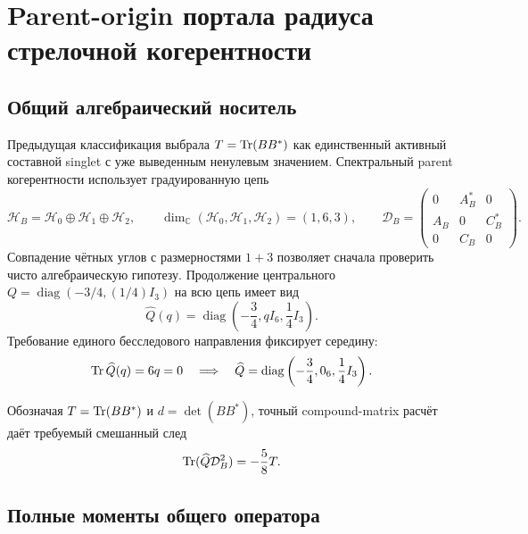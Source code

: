 \chapter{Parent-origin портала радиуса стрелочной когерентности}
\label{ch:v8-baryon-c0-edge-coherence-radius-portal-parent-origin}

\section{Общий алгебраический носитель}

Предыдущая классификация выбрала
$T=\operatorname{Tr}(BB^*)$ как единственный активный составной singlet с уже
выведенным ненулевым значением. Спектральный parent когерентности использует
градуированную цепь
\begin{equation}
 \mathcal H_B=\mathcal H_0\oplus\mathcal H_1\oplus\mathcal H_2,
 \qquad
 \dim_{\mathbb C}(\mathcal H_0,\mathcal H_1,\mathcal H_2)=(1,6,3),
 \qquad
 \mathcal D_B=
 \begin{pmatrix}0&A_B^*&0\\A_B&0&C_B^*\\0&C_B&0\end{pmatrix}.
 \label{eq:v8-coherence-portal-chain}
\end{equation}
Совпадение чётных углов с размерностями $1+3$ позволяет сначала проверить
чисто алгебраическую гипотезу. Продолжение центрального
$Q=\operatorname{diag}(-3/4,(1/4)I_3)$ на всю цепь имеет вид
\begin{equation}
 \widehat Q(q)=\operatorname{diag}
 \left(-\frac34,qI_6,\frac14I_3\right).
 \label{eq:v8-coherence-portal-general-q-extension}
\end{equation}
Требование единого бесследового направления фиксирует середину:
\begin{equation}
 \operatorname{Tr}\widehat Q(q)=6q=0
 \quad\Longrightarrow\quad
 \widehat Q=\operatorname{diag}
 \left(-\frac34,0_6,\frac14I_3\right).
 \label{eq:v8-coherence-portal-unique-q-extension}
\end{equation}

Обозначая $T=\operatorname{Tr}(BB^*)$ и $d=\det(BB^*)$, точный compound-matrix расчёт
даёт требуемый смешанный след
\begin{equation}
 \operatorname{Tr}(\widehat Q\mathcal D_B^2)=-\frac58T.
 \label{eq:v8-coherence-portal-marked-second-moment}
\end{equation}

\section{Полные моменты общего оператора}


